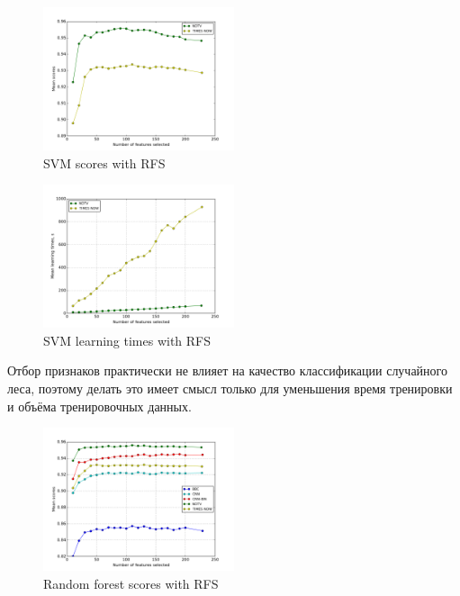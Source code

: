 \begin{figure}[h!]
    \centering
    \includegraphics[width=0.5\textwidth]{images/RFS-SVM.png}
    \caption{SVM scores with RFS}
    \label{fig:svm_rfs_scores}
\end{figure} 
\begin{figure}[h!]
    \centering
    \includegraphics[width=0.5\textwidth]{images/RFS-SVMTime.png}
    \caption{SVM learning times with RFS}
    \label{fig:svm_rfs_times}
\end{figure} 

\par
Отбор признаков практически не влияет на качество классификации случайного леса, поэтому делать это имеет смысл только для уменьшения время тренировки и объёма тренировочных данных.

\begin{figure}[h!]
    \centering
    \includegraphics[width=0.5\textwidth]{images/RFS-randforest.png}
    \caption{Random forest scores with RFS}
    \label{fig:randfor_rfs_scores}
\end{figure} 
 
